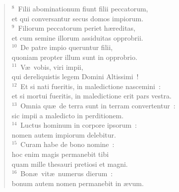 \begin{flushleft}\begin{verse}${}^{8}$~Filii abominationum fiunt filii peccatorum,\\ et qui conversantur secus domos impiorum.\\
${}^{9}$~Filiorum peccatorum periet h\ae reditas,\\ et cum semine illorum assiduitas opprobrii.\\
${}^{10}$~De patre impio queruntur filii,\\ quoniam propter illum sunt in opprobrio.\\
${}^{11}$~V\ae\ vobis, viri impii,\\ qui dereliquistis legem Domini Altissimi~!\\
${}^{12}$~Et si nati fueritis, in maledictione nascemini~:\\ et si mortui fueritis, in maledictione erit pars vestra.\\
${}^{13}$~Omnia qu\ae\ de terra sunt in terram convertentur~:\\ sic impii a maledicto in perditionem.\\
${}^{14}$~Luctus hominum in corpore ipsorum~:\\ nomen autem impiorum delebitur.\\
${}^{15}$~Curam habe de bono nomine~:\\ hoc enim magis permanebit tibi\\ quam mille thesauri pretiosi et magni.\\
${}^{16}$~Bon\ae\ vit\ae\ numerus dierum~:\\ bonum autem nomen permanebit in \ae vum.\end{verse}\end{flushleft}


